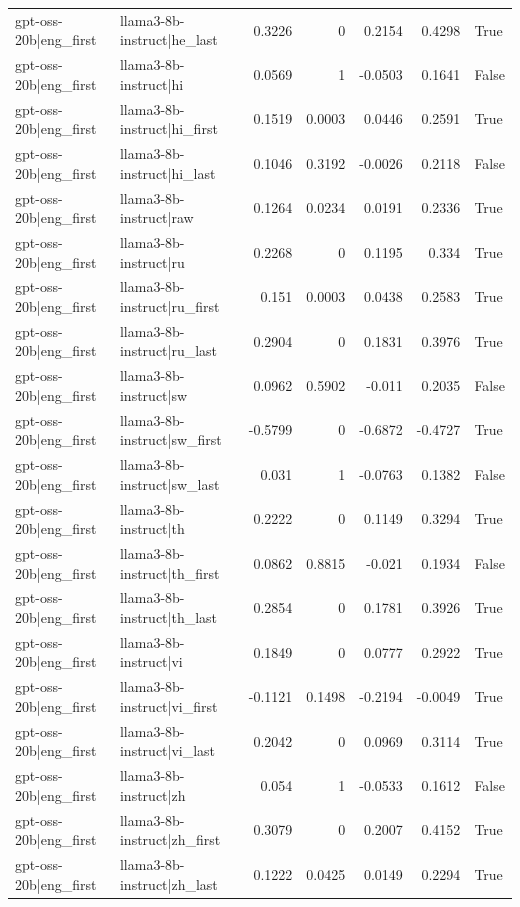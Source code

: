 \begin{table}
\begin{tabular}{l l r r r r l}
gpt-oss-20b|eng_first & llama3-8b-instruct|he_last & 0.3226 & 0 & 0.2154 & 0.4298 & True \\
gpt-oss-20b|eng_first & llama3-8b-instruct|hi & 0.0569 & 1 & -0.0503 & 0.1641 & False \\
gpt-oss-20b|eng_first & llama3-8b-instruct|hi_first & 0.1519 & 0.0003 & 0.0446 & 0.2591 & True \\
gpt-oss-20b|eng_first & llama3-8b-instruct|hi_last & 0.1046 & 0.3192 & -0.0026 & 0.2118 & False \\
gpt-oss-20b|eng_first & llama3-8b-instruct|raw & 0.1264 & 0.0234 & 0.0191 & 0.2336 & True \\
gpt-oss-20b|eng_first & llama3-8b-instruct|ru & 0.2268 & 0 & 0.1195 & 0.334 & True \\
gpt-oss-20b|eng_first & llama3-8b-instruct|ru_first & 0.151 & 0.0003 & 0.0438 & 0.2583 & True \\
gpt-oss-20b|eng_first & llama3-8b-instruct|ru_last & 0.2904 & 0 & 0.1831 & 0.3976 & True \\
gpt-oss-20b|eng_first & llama3-8b-instruct|sw & 0.0962 & 0.5902 & -0.011 & 0.2035 & False \\
gpt-oss-20b|eng_first & llama3-8b-instruct|sw_first & -0.5799 & 0 & -0.6872 & -0.4727 & True \\
gpt-oss-20b|eng_first & llama3-8b-instruct|sw_last & 0.031 & 1 & -0.0763 & 0.1382 & False \\
gpt-oss-20b|eng_first & llama3-8b-instruct|th & 0.2222 & 0 & 0.1149 & 0.3294 & True \\
gpt-oss-20b|eng_first & llama3-8b-instruct|th_first & 0.0862 & 0.8815 & -0.021 & 0.1934 & False \\
gpt-oss-20b|eng_first & llama3-8b-instruct|th_last & 0.2854 & 0 & 0.1781 & 0.3926 & True \\
gpt-oss-20b|eng_first & llama3-8b-instruct|vi & 0.1849 & 0 & 0.0777 & 0.2922 & True \\
gpt-oss-20b|eng_first & llama3-8b-instruct|vi_first & -0.1121 & 0.1498 & -0.2194 & -0.0049 & True \\
gpt-oss-20b|eng_first & llama3-8b-instruct|vi_last & 0.2042 & 0 & 0.0969 & 0.3114 & True \\
gpt-oss-20b|eng_first & llama3-8b-instruct|zh & 0.054 & 1 & -0.0533 & 0.1612 & False \\
gpt-oss-20b|eng_first & llama3-8b-instruct|zh_first & 0.3079 & 0 & 0.2007 & 0.4152 & True \\
gpt-oss-20b|eng_first & llama3-8b-instruct|zh_last & 0.1222 & 0.0425 & 0.0149 & 0.2294 & True \\

\end{tabular}
\end{table}
